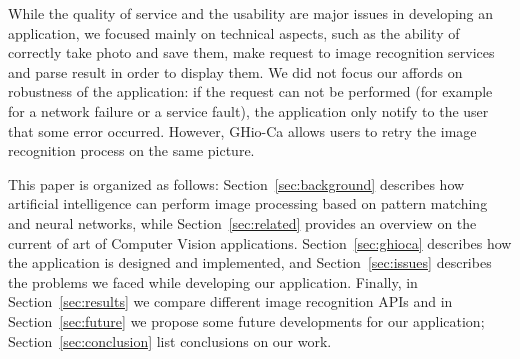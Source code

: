 While the quality of service and the usability are major issues in developing an 
application, we focused mainly on technical aspects, such as the ability of 
correctly take photo and save them, make request to image recognition services 
and parse result in order to display them. We did not focus our affords on 
robustness of the application: if the request can not be performed (for example 
for a network failure or a service fault), the application only notify to the 
user that some error occurred. However, GHio-Ca allows users to retry the image 
recognition process on the same picture.

This paper is organized as follows: Section~\ref{sec:background} describes how 
artificial intelligence can perform image processing based on pattern matching 
and neural networks, while Section~\ref{sec:related} provides an overview on the 
current of art of Computer Vision applications. Section~\ref{sec:ghioca} 
describes how the application is designed and implemented, and 
Section~\ref{sec:issues} describes the problems we faced while developing our 
application. Finally, in Section~\ref{sec:results} we compare different image 
recognition APIs and in Section~\ref{sec:future} we propose some future 
developments for our application; Section~\ref{sec:conclusion} list conclusions 
on our work.